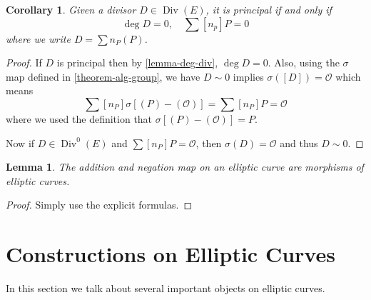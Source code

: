 \documentclass[12pt]{article}
\newtheorem{lemma}{Lemma}[subsection]
\newtheorem{corollary}{Corollary}[subsection]
\theoremstyle{remark}
\theoremstyle{definition}
\newcommand{\s}[0]{\sigma}
\newcommand{\ecO}[0]{\mathcal O}
\newcommand{\Div}[0]{\operatorname{Div}}
\begin{document}
        \begin{corollary}\label{corollary-principal-criterion}
            Given a divisor $D\in\Div(E)$, it is principal if and only if
            \[\deg D=0,\quad \sum [n_p]P=0\]
            where we write $D=\sum n_P(P)$.
        \end{corollary}
        \begin{proof}
            If $D$ is principal then by \autoref{lemma-deg-div}, $\deg D=0$. Also, using the $\s$ map defined in \autoref{theorem-alg-group}, we have $D\sim 0$ implies $\s([D])=\ecO$ which means
            \[\sum[n_P]\s[(P)-(\ecO)]=\sum [n_P]P=\ecO\]
            where we used the definition that $\s[(P)-(\ecO)]=P$.
            
            Now if $D\in\Div^0(E)$ and $\sum [n_P]P=\ecO$, then $\s(D)=\ecO$ and thus $D\sim 0$.
        \end{proof}
        \begin{lemma}\label{lemma-add-morph}
            The addition and negation map on an elliptic curve are morphisms of elliptic curves.
        \end{lemma}
        \begin{proof}
            Simply use the explicit formulas.
        \end{proof}
    
    \section{Constructions on Elliptic Curves}
        In this section we talk about several important objects on elliptic curves.

\end{document}

